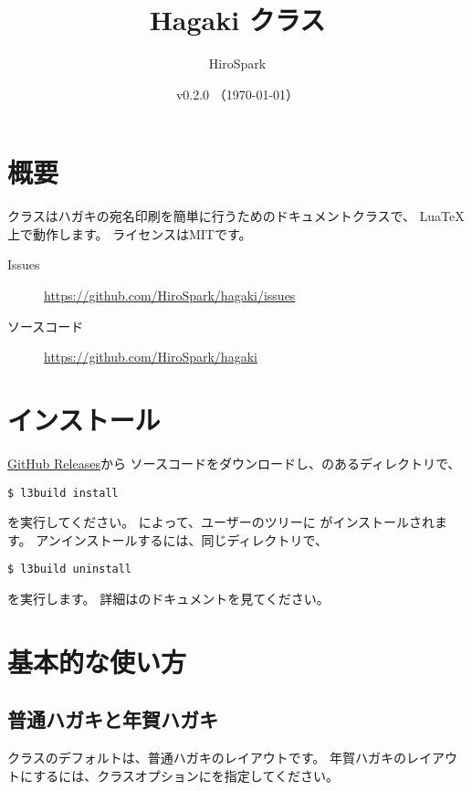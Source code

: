 \documentclass{hagaki-doc}
\title{Hagaki クラス}
\author{HiroSpark}
\date{v0.2.0 （\today）}
\begin{document}
\maketitle

\section{概要}

クラスはハガキの宛名印刷を簡単に行うためのドキュメントクラスで、
Lua\TeX{}上で動作します。
ライセンスはMITです。

\begin{description}
  \item[Issues] \url{https://github.com/HiroSpark/hagaki/issues}
  \item[ソースコード] \url{https://github.com/HiroSpark/hagaki}
\end{description}

\section{インストール}

\href{https://github.com/HiroSpark/hagaki/releases/}{GitHub Releases}から
ソースコードをダウンロードし、のあるディレクトリで、

\begin{lstlisting}
$ l3build install
\end{lstlisting}

を実行してください。
によって、ユーザーのツリーに
がインストールされます。
アンインストールするには、同じディレクトリで、

\begin{lstlisting}
$ l3build uninstall
\end{lstlisting}

を実行します。
詳細はのドキュメントを見てください。

\section{基本的な使い方}

\subsection{普通ハガキと年賀ハガキ}

クラスのデフォルトは、普通ハガキのレイアウトです。
年賀ハガキのレイアウトにするには、クラスオプションにを指定してください。
\end{document}
